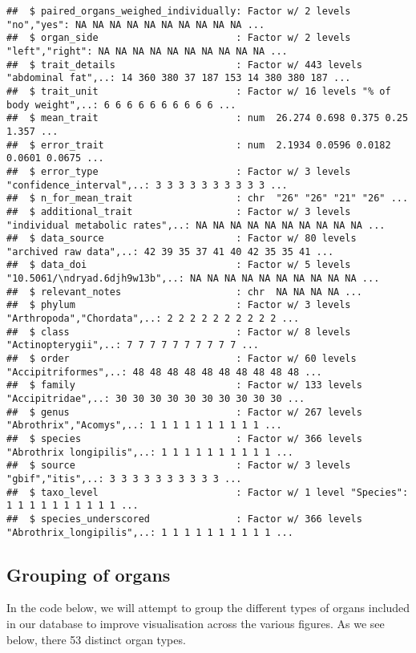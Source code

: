\documentclass[
]{article}
\begin{document}
\begin{verbatim}
##  $ paired_organs_weighed_individually: Factor w/ 2 levels "no","yes": NA NA NA NA NA NA NA NA NA NA ...
##  $ organ_side                        : Factor w/ 2 levels "left","right": NA NA NA NA NA NA NA NA NA NA ...
##  $ trait_details                     : Factor w/ 443 levels "abdominal fat",..: 14 360 380 37 187 153 14 380 380 187 ...
##  $ trait_unit                        : Factor w/ 16 levels "% of body weight",..: 6 6 6 6 6 6 6 6 6 6 ...
##  $ mean_trait                        : num  26.274 0.698 0.375 0.25 1.357 ...
##  $ error_trait                       : num  2.1934 0.0596 0.0182 0.0601 0.0675 ...
##  $ error_type                        : Factor w/ 3 levels "confidence_interval",..: 3 3 3 3 3 3 3 3 3 3 ...
##  $ n_for_mean_trait                  : chr  "26" "26" "21" "26" ...
##  $ additional_trait                  : Factor w/ 3 levels "individual metabolic rates",..: NA NA NA NA NA NA NA NA NA NA ...
##  $ data_source                       : Factor w/ 80 levels "archived raw data",..: 42 39 35 37 41 40 42 35 35 41 ...
##  $ data_doi                          : Factor w/ 5 levels "10.5061/\ndryad.6djh9w13b",..: NA NA NA NA NA NA NA NA NA NA ...
##  $ relevant_notes                    : chr  NA NA NA NA ...
##  $ phylum                            : Factor w/ 3 levels "Arthropoda","Chordata",..: 2 2 2 2 2 2 2 2 2 2 ...
##  $ class                             : Factor w/ 8 levels "Actinopterygii",..: 7 7 7 7 7 7 7 7 7 7 ...
##  $ order                             : Factor w/ 60 levels "Accipitriformes",..: 48 48 48 48 48 48 48 48 48 48 ...
##  $ family                            : Factor w/ 133 levels "Accipitridae",..: 30 30 30 30 30 30 30 30 30 30 ...
##  $ genus                             : Factor w/ 267 levels "Abrothrix","Acomys",..: 1 1 1 1 1 1 1 1 1 1 ...
##  $ species                           : Factor w/ 366 levels "Abrothrix longipilis",..: 1 1 1 1 1 1 1 1 1 1 ...
##  $ source                            : Factor w/ 3 levels "gbif","itis",..: 3 3 3 3 3 3 3 3 3 3 ...
##  $ taxo_level                        : Factor w/ 1 level "Species": 1 1 1 1 1 1 1 1 1 1 ...
##  $ species_underscored               : Factor w/ 366 levels "Abrothrix_longipilis",..: 1 1 1 1 1 1 1 1 1 1 ...
\end{verbatim}

\subsection{Grouping of organs}\label{grouping-of-organs}

In the code below, we will attempt to group the different types of organs included in our database to improve visualisation across the various figures. As we see below, there 53 distinct organ types.
\end{document}
